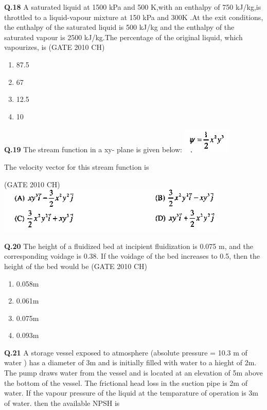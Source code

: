 \documentclass[journal,12pt,onecolumn]{exam}
\theoremstyle{remark}
\begin{document}
 \noindent
 \textbf{Q.18}
  A saturated liquid at 1500 kPa and 500 K,with an enthalpy of 750 kJ/kg,is throttled to a liquid-vapour mixture at 150 kPa and 300K .At the exit conditions, the enthalpy of the saturated liquid is 500 kJ/kg and the enthalpy of the saturated vapour is 2500 kJ/kg.The percentage of the original liquid, which vapourizes, is
 \hfill{(GATE 2010 CH)}\\

 \begin{enumerate}
     \item 87.5%
     \item 67%
     \item 12.5%
     \item 10%
     
 \end{enumerate}


\noindent
\textbf{Q.19}
   The stream function in a xy- plane is given below:
 \includegraphics[width=0.25\linewidth]{images/Q.19 image.png}

   The velocity vector for this stream function is

   \hfill{(GATE 2010 CH)}\\
  \includegraphics[width=1.0\linewidth]{images/Q.19 options.png}
      
\noindent
\textbf{Q.20}
   The height of a fluidized bed at incipient fluidization is 0.075 m, and the corresponding voidage is 0.38. If the voidage of the bed increases to 0.5, then the height of the bed would be
\hfill{(GATE 2010 CH)}\\

\begin{enumerate}
    \item 0.058m
    \item 0.061m
    \item 0.075m
    \item 0.093m
\end{enumerate}


\noindent
\textbf{Q.21}
   A storage vessel exposed to atmosphere (absolute pressure = 10.3 m of water ) has a diameter of 3m and is initially filled with water to a hieght of 2m. The pump draws water from the vessel and is located at an elevation of 5m above the bottom of the vessel. The frictional head loss in the suction pipe is 2m of water. If the vapour pressure of the liquid at the temparature of operation is 3m of water. then the available NPSH is
\end{document}
